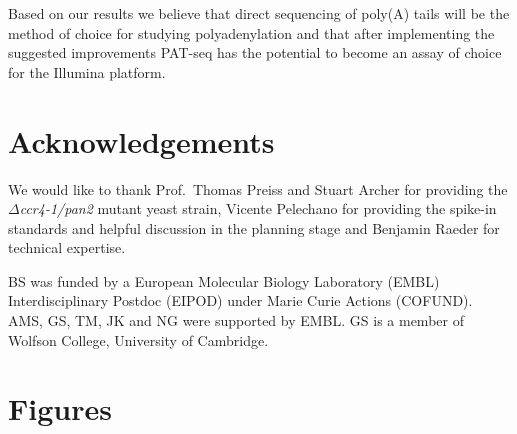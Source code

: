 \documentclass[10pt]{article}
\begin{document}
Based on our results we believe that direct sequencing of poly(A) tails will be the method of choice for studying polyadenylation and that after implementing the suggested improvements PAT-seq has the potential to become an assay of choice for the Illumina platform.
\section*{Acknowledgements}

We would like to thank Prof.\ Thomas Preiss and Stuart Archer for providing the \textit{$\Delta$ccr4-1/pan2} mutant yeast strain, Vicente Pelechano for providing the spike-in standards and helpful discussion in the planning stage and Benjamin Raeder for technical expertise.

BS was funded by a European Molecular Biology Laboratory (EMBL) Interdisciplinary Postdoc (EIPOD) under Marie Curie Actions (COFUND). AMS, GS, TM, JK and NG were supported by EMBL.  GS is a member of Wolfson College, University of Cambridge.

 
\section*{Figures}
\vspace{1cm}
\end{document}
